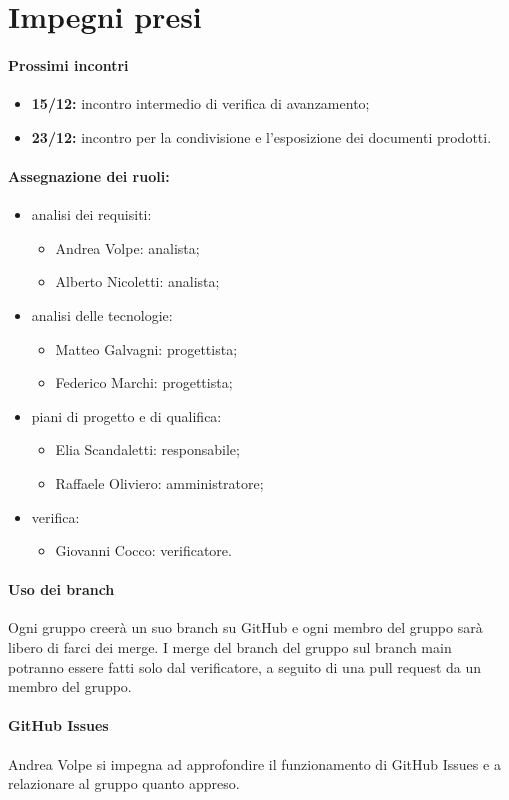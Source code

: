 \documentclass[a4paper, 12pt]{article}
\begin{document}
\section{Impegni presi}
\paragraph{Prossimi incontri}
\begin{itemize}
\item \textbf{15/12:} incontro intermedio di verifica di avanzamento;
\item \textbf{23/12:} incontro per la condivisione e l'esposizione dei documenti prodotti.
\end{itemize}

\paragraph{Assegnazione dei ruoli:}
\begin{itemize}
\item analisi dei requisiti:
	\begin{itemize}
	\item Andrea Volpe: analista;
	\item Alberto Nicoletti: analista;
	\end{itemize}
\item analisi delle tecnologie:
	\begin{itemize}
	\item Matteo Galvagni: progettista;
	\item Federico Marchi: progettista;
	\end{itemize}
\item piani di progetto e di qualifica:
	\begin{itemize}
	\item Elia Scandaletti: responsabile;
	\item Raffaele Oliviero: amministratore;
	\end{itemize}
\item verifica:
	\begin{itemize}
	\item Giovanni Cocco: verificatore.
	\end{itemize}
\end{itemize}

\paragraph{Uso dei branch}
Ogni gruppo creerà un suo branch su GitHub e ogni membro del gruppo sarà libero di farci dei merge. I merge del branch del gruppo sul branch main potranno essere fatti solo dal verificatore, a seguito di una pull request da un membro del gruppo.

\paragraph{GitHub Issues}
Andrea Volpe si impegna ad approfondire il funzionamento di GitHub Issues e a relazionare al gruppo quanto appreso.
\end{document}
